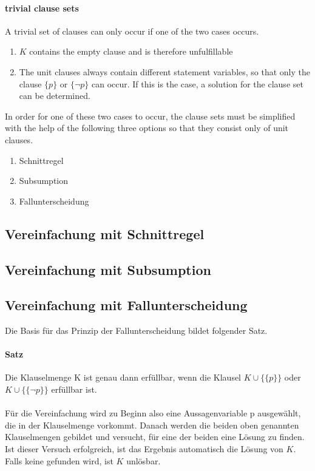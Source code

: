 \paragraph{trivial clause sets} %
A trivial set of clauses can only occur if one of the two cases occurs.
\begin{enumerate}
\item %
$K$ contains the empty clause and is therefore unfulfillable
\item %
The unit clauses always contain different statement variables, so that only the clause $\{p\}$ or $\{\neg p\}$ can occur. If this is the case, a solution for the clause set can be determined.
\\
\end{enumerate}
In order for one of these two cases to occur, the clause sets must be simplified with the help of the following three options so that they consist only of unit clauses.
\begin{enumerate}
\item Schnittregel %
\item Subsumption
\item Fallunterscheidung
\end{enumerate}
\subsection{Vereinfachung mit Schnittregel} %
\subsection{Vereinfachung mit Subsumption}
\subsection{Vereinfachung mit Fallunterscheidung}
Die Basis für das Prinzip der Fallunterscheidung bildet folgender Satz.
\paragraph{Satz} Die Klauselmenge K ist genau dann erfüllbar, wenn die Klausel $K \cup \bigl\{\{p\}\bigr\}$ oder $K \cup \bigl\{\{\neg p\}\bigr\}$ erfüllbar ist.
\\
\\
Für die Vereinfachung wird zu Beginn also eine Aussagenvariable p ausgewählt, die in der Klauselmenge vorkommt. Danach werden die beiden oben genannten Klauselmengen gebildet und versucht, für eine der beiden eine Lösung zu finden. Ist dieser Versuch erfolgreich, ist das Ergebnis automatisch die Lösung von $K$. Falls keine gefunden wird, ist $K$ unlösbar.
